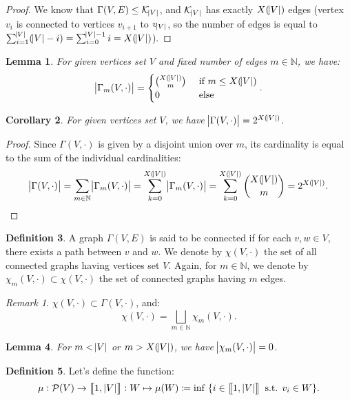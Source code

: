 \documentclass{article}
\newtheorem{lemma}{Lemma}[section]
\newtheorem{corollary}[lemma]{Corollary}
\theoremstyle{definition}
\newtheorem{definition}[lemma]{Definition}
\theoremstyle{remark}
\newtheorem*{remark}{Remark}
\newcommand{\N}{\mathbb N}
\newcommand{\intint}[2]{\left\llbracket#1, \, #2\right\rrbracket}
\newcommand{\st}{\text{ s.t. }}
\begin{document}
		\begin{proof} We know that $\Gamma(V, E) \leq \mathcal K_{\abs V}$, and $\mathcal K_{\abs V}$ has exactly $X(\abs V)$ edges (vertex $v_i$ is connected
		to vertices $v_{i+1}$ to $v_{\abs V}$, so the number of edges is equal to $\sum_{i=1}^{\abs V}(\abs V - i) = \sum_{i=0}^{\abs V - 1}i = X(\abs V)$).
		\end{proof}

		\begin{lemma} For given vertices set $V$ and fixed number of edges $m \in \N$, we have:
		\[\abs {\Gamma_m(V, \cdot)} = \begin{cases}\binom {X(\abs V)}m &\text{ if } m \leq X(\abs V) \\0 &\text{ else}\end{cases}.\]
		\end{lemma}

		\begin{corollary} For given vertices set $V$, we have $\abs {\Gamma(V, \cdot)} = 2^{X(\abs V)}$.
		\end{corollary}

		\begin{proof} Since $\Gamma(V, \cdot)$ is given by a disjoint union over $m$, its cardinality is equal to the sum of the individual cardinalities:
		\[\abs {\Gamma(V, \cdot)} = \sum_{m \in \N}\abs {\Gamma_m(V, \cdot)} = \sum_{k=0}^{X(\abs V)}\abs {\Gamma_m(V, \cdot)} = \sum_{k=0}^{X(\abs V)}\binom {X(\abs V)}m = 2^{X(\abs V)}.\]
		\end{proof}

		\begin{definition} A graph $\Gamma(V, E)$ is said to be connected if for each $v, w \in V$, there exists a path between $v$ and $w$. We denote by $\chi(V, \cdot)$ the
		set of all connected graphs having vertices set $V$. Again, for $m \in \N$, we denote by $\chi_m(V, \cdot) \subset \chi(V, \cdot)$ the set of connected graphs having $m$ edges.
		\end{definition}

		\begin{remark} $\chi(V, \cdot) \subset \Gamma(V, \cdot)$, and:
		\[\chi(V, \cdot) = \bigsqcup_{m \in \N}\chi_m(V, \cdot).\]
		\end{remark}

		\begin{lemma} For $m < \abs V$ or $m > X(\abs V)$, we have $\abs {\chi_m(V, \cdot)} = 0$.
		\end{lemma}

		\begin{definition}\label{def:mu function} Let's define the function:
		\[\mu : \mathcal P(V) \to \intint 1{\abs V} : W \mapsto \mu(W) \coloneqq \inf\; \{i \in \intint 1{\abs V} \st v_i \in W\}.\]
		\end{definition}
\end{document}
